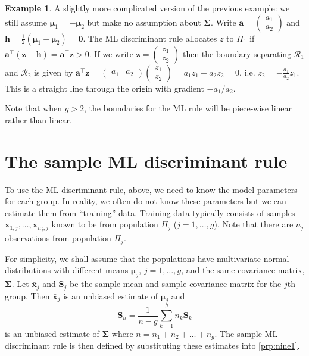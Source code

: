 \documentclass[]{book}
\theoremstyle{definition}
\theoremstyle{definition}
\newtheorem{example}{Example}[chapter]
\theoremstyle{definition}
\theoremstyle{remark}
\begin{document}
\begin{example}
\protect\hypertarget{exm:exnine3}{}{\label{exm:exnine3} }A slightly more complicated version of the previous example: we still assume \(\boldsymbol \mu_1=-\boldsymbol \mu_2\) but make no assumption about \(\boldsymbol \Sigma\). Write \(\boldsymbol a= \begin{pmatrix} a_1 \\ a_2 \end{pmatrix}\) and \(\boldsymbol h= \frac{1}{2}( \boldsymbol \mu_1 + \boldsymbol \mu_2 ) = \boldsymbol 0\). The ML discriminant rule allocates \(z\) to \(\Pi_1\) if \(\boldsymbol a^\top (\boldsymbol z- \boldsymbol h) = \boldsymbol a^\top \boldsymbol z> 0\). If we write \(\boldsymbol z= \begin{pmatrix} z_1 \\ z_2 \end{pmatrix}\) then the boundary separating \(\mathcal R_1\) and \(\mathcal R_2\) is given by \(\boldsymbol a^\top \boldsymbol z= \begin{pmatrix} a_1 & a_2 \end{pmatrix} \begin{pmatrix} z_1 \\ z_2 \end{pmatrix} = a_1 z_1 + a_2 z_2 = 0\), i.e. \(z_2 = -\frac{a_1}{a_2} z_1\). This is a straight line through the origin with gradient \(-a_1/a_2\).
\end{example}

Note that when \(g>2\), the boundaries for the ML rule will be piece-wise linear rather than linear.

\hypertarget{the-sample-ml-discriminant-rule}{%
\section{The sample ML discriminant rule}\label{the-sample-ml-discriminant-rule}}

To use the ML discriminant rule, above, we need to know the model parameters for each group. In reality, we often do not know these parameters but we can estimate them from ``training'' data. Training data typically consists of samples \(\boldsymbol x_{1,j}, \ldots, \boldsymbol x_{n_j,j}\) known to be from population \(\Pi_j\) (\(j=1,\ldots ,g\)). Note that there are \(n_j\) observations from population \(\Pi_j\).

For simplicity, we shall assume that the populations have multivariate normal distributions with different means \(\boldsymbol \mu_j\), \(j=1,\ldots,g\), and the same covariance matrix, \(\boldsymbol \Sigma\). Let \(\bar{\boldsymbol x}_j\) and \(\boldsymbol S_j\) be the sample mean and sample covariance matrix for the \(j\)th group. Then \(\bar{\boldsymbol x}_j\) is an unbiased estimate of \(\boldsymbol \mu_j\) and
\[\boldsymbol S_u = \frac{1}{n-g} \sum_{k=1}^g n_k \boldsymbol S_k\]
is an unbiased estimate of \(\boldsymbol \Sigma\) where \(n = n_1 + n_2 + \ldots + n_g\). The sample ML discriminant rule is then defined by substituting these estimates into \ref{prp:nine1}.
\end{document}
